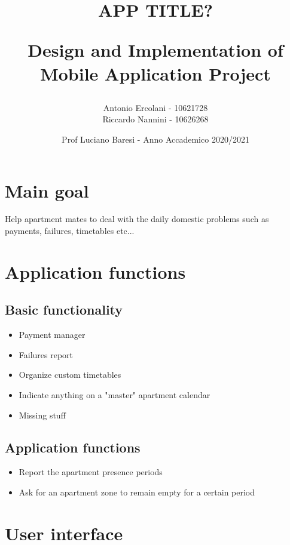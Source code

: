 \documentclass[]{article}
\title{ APP TITLE? \\
	\begin{large} 
		Design and Implementation of Mobile Application Project
	\end{large}}
\author{Antonio Ercolani - 10621728\\Riccardo Nannini - 10626268}
\date{Prof Luciano Baresi - Anno Accademico 2020/2021}
\begin{document}
	
	\maketitle
	
	\begin{paragraph}
		\newline
	\end{paragraph}
	
	\tableofcontents
	
	\newpage
	
	\section{Main goal}
	
	Help apartment mates to deal with the daily domestic problems such as payments, failures, timetables etc...
	
	\section{Application functions}
	
		\subsection{Basic functionality}
		\begin{itemize}
			\item Payment manager
			\item Failures report 
			\item Organize custom timetables
			\item Indicate anything on a "master" apartment calendar 
			\item Missing stuff
		\end{itemize}

		\subsection{Application functions}
		
		\begin{itemize}
			\item Report the apartment presence periods 
			\item Ask for an apartment zone to remain empty for a certain period 
		\end{itemize}

	\section{User interface}
	
\end{document}
